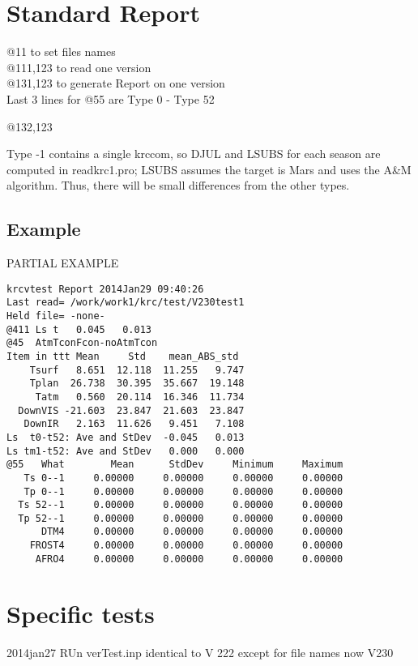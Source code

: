 \documentclass{article}  %
\begin{document}
\section{Standard Report}%
 @11 to set files names
\\ @111,123 to read one version
\\ @131,123 to generate Report on one version
\\ Last 3 lines for @55 are Type 0 - Type 52

@132,123 

Type -1 contains a single krccom, so DJUL and LSUBS for each season are computed in readkrc1.pro; LSUBS assumes the target is Mars and uses the A\&M algorithm. Thus, there will be small differences from the other types.

\subsection{Example} %
PARTIAL EXAMPLE
\vspace{-3.mm} 
\begin{verbatim}
krcvtest Report 2014Jan29 09:40:26
Last read= /work/work1/krc/test/V230test1
Held file= -none-
@411 Ls t   0.045   0.013
@45  AtmTconFcon-noAtmTcon
Item in ttt Mean     Std    mean_ABS_std
    Tsurf   8.651  12.118  11.255   9.747
    Tplan  26.738  30.395  35.667  19.148
     Tatm   0.560  20.114  16.346  11.734
  DownVIS -21.603  23.847  21.603  23.847
   DownIR   2.163  11.626   9.451   7.108
Ls  t0-t52: Ave and StDev  -0.045   0.013
Ls tm1-t52: Ave and StDev   0.000   0.000
@55   What        Mean      StdDev     Minimum     Maximum
   Ts 0--1     0.00000     0.00000     0.00000     0.00000
   Tp 0--1     0.00000     0.00000     0.00000     0.00000
  Ts 52--1     0.00000     0.00000     0.00000     0.00000
  Tp 52--1     0.00000     0.00000     0.00000     0.00000
      DTM4     0.00000     0.00000     0.00000     0.00000
    FROST4     0.00000     0.00000     0.00000     0.00000
     AFRO4     0.00000     0.00000     0.00000     0.00000
\end{verbatim}

\section{Specific tests}%

2014jan27 RUn verTest.inp identical to V 222 except for file names now V230
\end{document}
